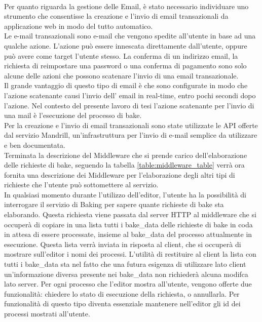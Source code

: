 \\
Per quanto riguarda la gestione delle Email, è stato necessario individuare uno strumento che consentisse la creazione e l’invio di email transazionali da applicazione web in modo del tutto automatico. 
\\
Le e-mail transazionali sono e-mail che vengono spedite all’utente in base ad una qualche azione. L’azione può essere innescata direttamente dall’utente, oppure può avere come target l’utente stesso. La conferma di un indirizzo email, la richiesta di reimpostare una password o una conferma di pagamento sono solo alcune delle azioni che possono scatenare l’invio di una email transazionale. 
\\
Il grande vantaggio di questo tipo di email è che sono configurate in modo che l’azione scatenante causi l’invio dell’ email in real-time, entro pochi secondi dopo l’azione. Nel contesto del presente lavoro di tesi l’azione scatenante per l’invio di una mail è l’esecuzione del processo di bake. 
\\
Per la creazione e l’invio di email transazionali sono state utilizzate le API offerte dal servizio Mandrill, un’infrastruttura per l’invio di e-mail semplice da utilizzare e ben documentata.
\\
Terminata la descrizione del Middleware che si prende carico dell'elaborazione delle richieste di bake, seguendo la tabella \ref{table:middleware_table} verrà ora fornita una descrizione dei Middleware per l'elaborazione degli altri tipi di richieste che l'utente può sottomettere al servizio.
\\ 
In qualsiasi momento durante l’utilizzo dell’editor, l’utente ha la possibilità di interrogare il servizio di Baking per sapere quante richieste di bake sta elaborando. 
Questa richiesta viene passata dal server HTTP al middleware che si occuperà di copiare in una lista tutti i bake\_data delle richieste di bake in coda in attesa di essere processate, insieme al bake\_data del processo attualmente in esecuzione. 
Questa lista verrà inviata in risposta al client, che si occuperà di mostrare sull’editor i nomi dei processi.
L’utilità di restituire al client la lista con tutti i bake\_data sta nel fatto che una futura esigenza di utilizzare lato client un’informazione diversa presente nei bake\_data non richiederà alcuna modifca lato server. 
Per ogni processo che l’editor mostra all’utente, vengono offerte due funzionalità: chiedere lo stato di esecuzione della richiesta, o annullarla. Per funzionalità di questo tipo diventa essenziale mantenere nell’editor gli id dei processi mostrati all’utente.
